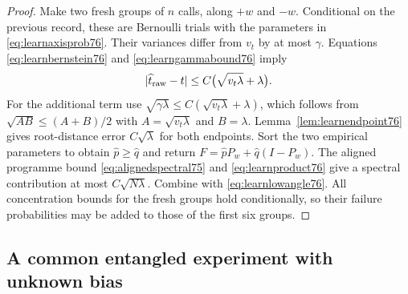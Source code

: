 \begin{proof}
Make two fresh groups of $n$ calls, along $+w$ and $-w$.
Conditional on the previous record, these are Bernoulli trials with
the parameters in \eqref{eq:learnaxisprob76}.  Their variances differ
from $v_t$ by at most $\gamma$.  Equations
\eqref{eq:learnbernstein76} and \eqref{eq:learngammabound76} imply
\[
 |\widehat t_{\rm raw}-t|
       \le C\bigl(\sqrt{v_t\lambda}+\lambda\bigr).
\]
For the additional term use
$\sqrt{\gamma\lambda}
 \le C(\sqrt{v_t\lambda}+\lambda)$, which follows from
$\sqrt{AB}\le(A+B)/2$ with
$A=\sqrt{v_t\lambda}$ and $B=\lambda$.
Lemma~\ref{lem:learnendpoint76} gives root-distance error
$C\sqrt\lambda$ for both endpoints.  Sort the two empirical
parameters to obtain $\widehat p\ge\widehat q$ and return
$F=\widehat pP_w+\widehat q(I-P_w)$.  The aligned programme
bound \eqref{eq:alignedspectral75} and
\eqref{eq:learnproduct76} give a spectral contribution at most
$C\sqrt{N\lambda}$.  Combine with \eqref{eq:learnlowangle76}.
All concentration bounds for the fresh groups hold conditionally,
so their failure probabilities may be added to those of the first
six groups.
\end{proof}

\subsection{A common entangled experiment with unknown bias}

